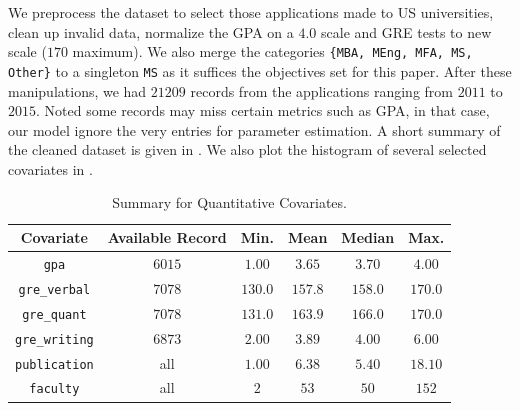 \documentclass{article}
\newcommand{\var}[1]{\texttt{#1}}
\begin{document}
	We preprocess the dataset to select those applications made to US universities,
	clean up invalid data, normalize the GPA on a $4.0$ scale and GRE tests
	to new scale ($170$ maximum). We also merge the categories \var{\{MBA, MEng, MFA, MS, Other\}}
	to a singleton \var{MS} as it suffices the objectives set for this paper. After these manipulations,
	we had $21209$ records from the applications ranging from $2011$ to $2015$. Noted some records
	may miss certain metrics such as GPA, in that case, our model ignore the very entries for parameter
	estimation. A short summary of the cleaned dataset is given in . We also plot the histogram of several selected covariates in .

	\begin{table}[htpb]
	    \centering
	    \begin{tabular}{|c|c|c|c|c|c|}
		\hline
		Covariate & Available Record & Min. & Mean & Median & Max. \\\hline
		\var{gpa} & $6015$ & $1.00$ & $3.65$ & $3.70$ & $4.00$ \\\hline
		\var{gre\_verbal} & $7078$ & $130.0$ & $157.8$ & $158.0$ & $170.0$ \\\hline
		\var{gre\_quant} & $7078$ & $131.0$ & $163.9$ & $166.0$ & $170.0$ \\\hline
		\var{gre\_writing} & $6873$ & $2.00$ & $3.89$ & $4.00$ & $6.00$ \\\hline
		\var{publication} & all & $1.00$ & $6.38$ & $5.40$ & $18.10$ \\\hline
		\var{faculty} & all & $2$ & $53$ & $50$ & $152$ \\\hline
	    \end{tabular}
	    \caption{Summary for Quantitative Covariates.}
	    \label{table:data_summary:quant}
	\end{table}
\end{document}
